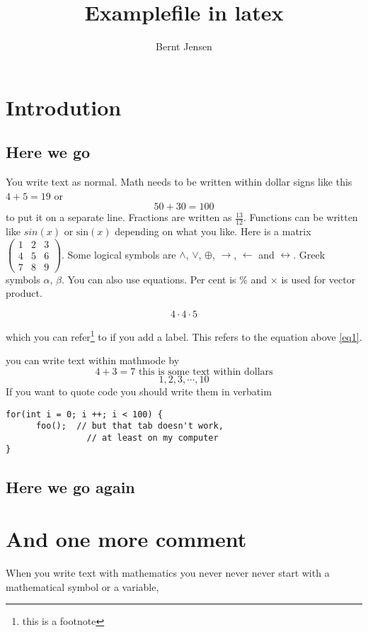 \documentclass[12pt]{amsart}
\title{Examplefile in latex}
\author{Bernt Jensen}
\begin{document}
 

\maketitle

\section{Introdution}

\subsection{Here we go}



You write text as normal. Math needs to be written within dollar signs like this $4+5=19$ or $$50+30=100$$ to put it on a separate line.
Fractions are written as $\frac{13}{12}$. Functions can be written like $sin(x)$ or $\mathrm{sin}(x)$ depending on what you like.
Here is a matrix $\begin{pmatrix}1 & 2 & 3 \\ 4 & 5 & 6 \\ 7 & 8 & 9\end{pmatrix}$. Some logical symbols are $\wedge$, $\vee$, $\oplus$, $\rightarrow$,
$\leftarrow$ and $\leftrightarrow$. Greek symbols $\alpha$, $\beta$. You can also use equations. Per cent is $\%$ and $\times$ is used for vector product.

\begin{equation} \label{eq1}
4\cdot 4 \cdot 5
\end{equation}

which you can refer\footnote{this is a footnote} to if you add a label. This refers to the equation above \ref{eq1}.

you can write text within mathmode by $$4+3=7 \mbox{ this is some text within dollars}$$
$$1,2,3,\cdots,10$$
If you want to quote code you should write them in verbatim

\vspace{10pt}

\begin{verbatim}
for(int i = 0; i ++; i < 100) {
      foo();  // but that tab doesn't work,
                // at least on my computer
}
\end{verbatim}

\subsection{Here we go again}

\section{And one more comment}


When you write text with mathematics you never never never start with a mathematical symbol or a variable,
\end{document}
